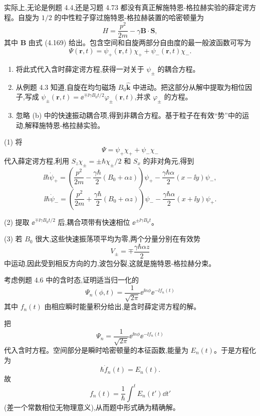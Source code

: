 \begin{question}
实际上,无论是例题 4.4,还是习题 4.73 都没有真正解施特恩-格拉赫实验的薛定谔方程。自旋为 $1/2$ 的中性粒子穿过施特恩-格拉赫装置的哈密顿量为
\[
H=\frac{p^2}{2m}-\gamma\mathbf B\cdot\mathbf S,
\]
其中 $\mathbf B$ 由式 (4.169) 给出。包含空间和自旋两部分自由度的最一般波函数可写为
\[
\Psi(\mathbf r,t)=\psi_+(\mathbf r,t)\chi_+ + \psi_-(\mathbf r,t)\chi_-.
\]
\begin{enumerate}
\item 将此式代入含时薛定谔方程,获得一对关于 $\psi_\pm$ 的耦合方程。
\item 从例题 4.3 知道,自旋在均匀磁场 $B_0\hat{\mathbf k}$ 中进动。把这部分从解中提取为相位因子,写成 $\psi_\pm(\mathbf r,t)=\ee^{\mp \ii\gamma B_0t/2}\varphi_\pm(\mathbf r,t)$,并求 $\varphi_\pm$ 的方程。
\item 忽略 (b) 中的快速振动耦合项,得到非耦合方程。基于粒子在有效“势”中的运动,解释施特恩-格拉赫实验。
\end{enumerate}

\par\smallskip
{}

\end{question}
\begin{solution}

(1) 将
\[
\Psi=\psi_+\chi_++\psi_-\chi_-
\]
代入薛定谔方程,利用 $S_z\chi_\pm=\pm\hbar\chi_\pm/2$ 和 $S_x$ 的非对角元,得到
\[
\ii\hbar\dot\psi_+=\left(\frac{p^2}{2m}-\frac{\gamma\hbar}{2}(B_0+\alpha z)\right)\psi_+-\frac{\gamma\hbar\alpha}{2}(x-\ii y)\psi_-,
\]
\[
\ii\hbar\dot\psi_-=\left(\frac{p^2}{2m}+\frac{\gamma\hbar}{2}(B_0+\alpha z)\right)\psi_- -\frac{\gamma\hbar\alpha}{2}(x+\ii y)\psi_+.
\]

(2) 提取 $\ee^{\mp\ii\gamma B_0t/2}$ 后,耦合项带有快速相位 $\ee^{\pm\ii\gamma B_0t}$。

(3) 若 $B_0$ 很大,这些快速振荡项平均为零,两个分量分别在有效势
\[
V_\pm=\mp\frac{\gamma\hbar\alpha z}{2}
\]
中运动,因此受到相反方向的力,波包分裂,这就是施特恩-格拉赫分束。

\end{solution}

\begin{question}
考虑例题 4.6 中的含时态,证明适当归一化的
\[
\Psi_n(\phi,t)=\frac{1}{\sqrt{2\pi}}\ee^{\ii n\phi}\ee^{-\ii f_n(t)}
\]
其中 $f_n(t)$ 由相应瞬时能量积分给出,是含时薛定谔方程的解。
\end{question}
\begin{solution}

把
\[
\Psi_n=\frac{1}{\sqrt{2\pi}}\ee^{\ii n\phi}\ee^{-\ii f_n(t)}
\]
代入含时方程。空间部分是瞬时哈密顿量的本征函数,能量为 $E_n(t)$。于是方程化为
\[
\hbar\dot f_n(t)=E_n(t).
\]
故
\[
f_n(t)=\frac1\hbar\int^t E_n(t')\dd t'
\]
(差一个常数相位无物理意义),从而题中形式确为精确解。

\end{solution}

